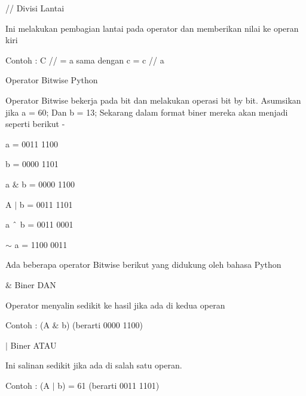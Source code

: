 \noindent 
\vspace{12pt}
\noindent 
// Divisi Lantai \par
\noindent 
Ini melakukan pembagian lantai pada operator dan memberikan nilai ke operan kiri \par
\noindent 
Contoh : C // = a sama dengan c = c // a \par
\noindent 
\vspace{12pt}
\noindent 
Operator Bitwise Python \par
\vspace{12pt}
\noindent 
Operator Bitwise bekerja pada bit dan melakukan operasi bit by bit. $  $Asumsikan jika a = 60; $  $Dan b = 13; $  $Sekarang dalam format biner mereka akan menjadi seperti berikut - \par
\vspace{12pt}
\noindent 
a = 0011 1100 \par
\vspace{12pt}
\noindent 
b = 0000 1101 \par
\vspace{12pt}
\vspace{12pt}
\noindent 
a  $  \&  $ b = 0000 1100 \par
\vspace{12pt}
\noindent 
A  $  \vert  $ b = 0011 1101 \par
\vspace{12pt}
\noindent 
a  $  \string^  $ b = 0011 0001 \par
\vspace{12pt}
\noindent 
 $  \sim  $ a = 1100 0011 \par
\vspace{12pt}
\noindent 
Ada beberapa operator Bitwise berikut yang didukung oleh bahasa Python \par
\vspace{12pt}
\noindent 
 $  \&  $ Biner DAN \par
\noindent 
Operator menyalin sedikit ke hasil jika ada di kedua operan \par
\noindent 
Contoh : (A  $  \&  $ b) (berarti 0000 1100) \par
\vspace{12pt}
\noindent 
 $  \vert  $ $  $Biner ATAU \par
\noindent 
Ini salinan sedikit jika ada di salah satu operan. \par
\noindent 
Contoh : (A  $  \vert  $ b) = 61 (berarti 0011 1101) \par
\vspace{12pt}
\noindent 

